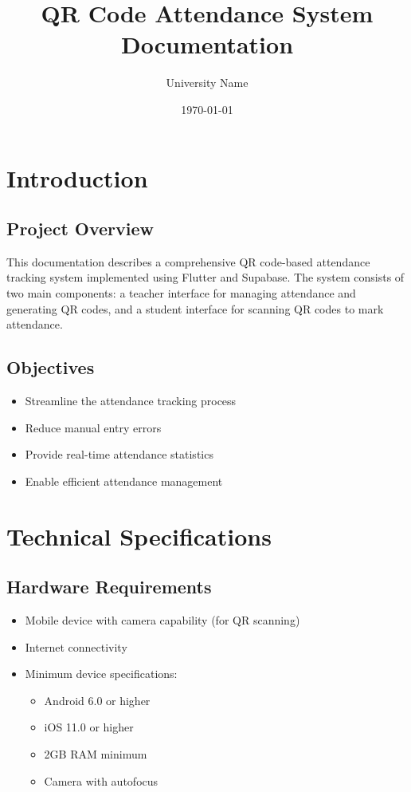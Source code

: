\documentclass[12pt,a4paper]{report}
\title{QR Code Attendance System\\Documentation}
\author{University Name}
\date{\today}
\begin{document}
\maketitle
\tableofcontents
\newpage

\chapter{Introduction}
\section{Project Overview}
This documentation describes a comprehensive QR code-based attendance tracking system implemented using Flutter and Supabase. The system consists of two main components: a teacher interface for managing attendance and generating QR codes, and a student interface for scanning QR codes to mark attendance.

\section{Objectives}
\begin{itemize}
    \item Streamline the attendance tracking process
    \item Reduce manual entry errors
    \item Provide real-time attendance statistics
    \item Enable efficient attendance management
\end{itemize}

\chapter{Technical Specifications}
\section{Hardware Requirements}
\begin{itemize}
    \item Mobile device with camera capability (for QR scanning)
    \item Internet connectivity
    \item Minimum device specifications:
    \begin{itemize}
        \item Android 6.0 or higher
        \item iOS 11.0 or higher
        \item 2GB RAM minimum
        \item Camera with autofocus
    \end{itemize}
\end{itemize}
\end{document}
